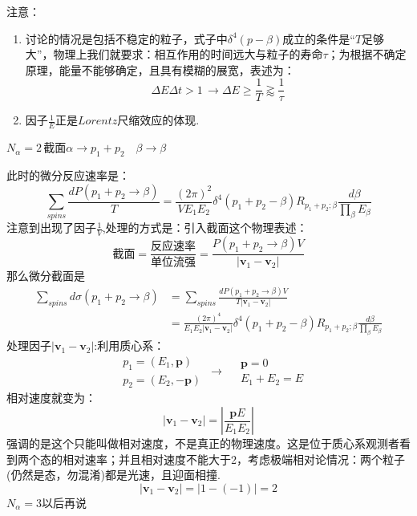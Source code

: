 注意：\begin{enumerate}
    \item 讨论的情况是包括不稳定的粒子，式子中$\delta^4(p-\beta)$成立的条件是“$T$足够大”，物理上我们就要求：相互作用的时间远大与粒子的寿命$\tau$；为根据不确定原理，能量不能够确定，且具有模糊的展宽，表述为：
    $$
        \Delta E \Delta t >1\,\to \Delta E\geq \frac{1}{T}\gtrapprox \frac{1}{\tau}
    $$
    \item 因子$\frac{1}{E}$正是$Lorentz$尺缩效应的体现.
\end{enumerate}

\begin{center}
    \begin{tcolorbox}[colback=white!5,colframe=black!55,width=7.5cm]
        \centering$N_\alpha=2$\,截面\qquad $\alpha\to p_1+p_2\quad\beta\to\beta$
    \end{tcolorbox}
\end{center}
此时的微分反应速率是：
$$
     \sum_{spins}\frac{dP(p_1+p_2\to\beta)}{T}= \frac{(2\pi)^2}{VE_1E_2}\delta^4(p_1+p_2-\beta)R_{p_1+p_2;\beta}\frac{d\beta}{\prod_{\beta}E_{\beta}}     
$$
注意到出现了因子$\frac{1}{V}$,处理的方式是：引入截面这个物理表述：
\[
\text{截面}=\frac{\text{反应速率}}{\text{单位流强}}=\frac{P(p_1+p_2\to\beta)V}{|\boldsymbol{v}_1-\boldsymbol{v}_2|}
\]
那么微分截面是
\begin{equation}
    \begin{aligned}
            \sum_{spins}d\sigma(p_1+p_2\to\beta)
            &=\sum_{spins}\frac{dP(p_1+p_2\to\beta)V}{T|\boldsymbol{v}_1-\boldsymbol{v}_2|}\\
            &=\frac{(2\pi)^4}{E_1E_2|\boldsymbol{v}_1-\boldsymbol{v}_2|}\delta^4(p_1+p_2-\beta)R_{p_1+p_2;\beta}\frac{d\beta}{\prod_{\beta}E_{\beta}}
    \end{aligned}
\end{equation}
处理因子$|\boldsymbol{v}_1-\boldsymbol{v}_2|$:利用质心系：
\[\begin{aligned}
    &p_1=(E_1,\boldsymbol{p})\\
    &p_2=(E_2,-\boldsymbol{p})
\end{aligned}
\,\to\,\begin{aligned}
    &\boldsymbol{p}=0\\
    &E_1+E_2=E
\end{aligned}\]
相对速度就变为：
$$
   |\boldsymbol{v}_1-\boldsymbol{v}_2|=|\frac{\boldsymbol{p}E}{E_1E_2}| 
$$
强调的是这个只能叫做相对速度，不是真正的物理速度。这是位于质心系观测者看到两个态的相对速率；并且相对速度不能大于2，考虑极端相对论情况：两个粒子(仍然是态，勿混淆)都是光速，且迎面相撞.
$$|\boldsymbol{v}_1-\boldsymbol{v}_2|=|1-(-1)|=2$$
$N_\alpha=3$以后再说

